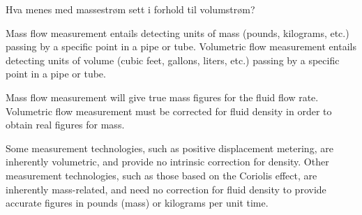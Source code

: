 

Hva menes med massestrøm sett i forhold til volumstrøm?







Mass flow measurement entails detecting units of mass (pounds, kilograms, etc.) passing by a specific point in a pipe or tube.  Volumetric flow measurement entails detecting units of volume (cubic feet, gallons, liters, etc.) passing by a specific point in a pipe or tube.

Mass flow measurement will give true mass figures for the fluid flow rate.  Volumetric flow measurement must be corrected for fluid density in order to obtain real figures for mass.







Some measurement technologies, such as positive displacement metering, are inherently volumetric, and provide no intrinsic correction for density.  Other measurement technologies, such as those based on the Coriolis effect, are inherently mass-related, and need no correction for fluid density to provide accurate figures in pounds (mass) or kilograms per unit time.




